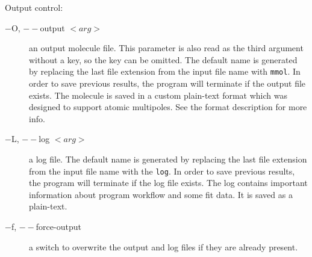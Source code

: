 \documentclass[10pt,a4paper]{article}
\begin{document}
Output control:
\begin{description}
\item[$-$O, $--$output $<arg>$] an output molecule file. This parameter is 
also read as the third argument without a key, so the key can be omitted. 
The default name is generated by
replacing the last file extension from the input file name with \lstinline{mmol}. In order 
to save previous results, the program will terminate if the output file exists. The molecule
is saved in a custom plain-text format which was designed to support atomic multipoles. 
See the format description for more info.
\item[$-$L, $--$log $<arg>$] a log file. The default name is generated by 
replacing the last file extension from the input file name with the \lstinline{log}. 
In order to 
save previous results, the program will terminate if the log file exists. The log
contains important information about program workflow and some fit data. It is
saved as a plain-text.
\item[$-$f, $--$force-output] a switch to overwrite the output and log files if they are
already present. 
\end{description}
\end{document}
